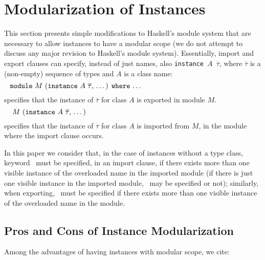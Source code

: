 \section{Modularization of Instances}
\label{sec:modular-instances}

This section presents simple modifications to Haskell's module system
that are necessary to allow instances to have a modular scope
\cite{Controlling-scope-instances} (we do not attempt to discuss any
major revision to Haskell's module system). Essentially, import and
export clauses can specify, instead of just names, also {\tt instance
  $A$ $\overline{\tau}$}, where $\overline{\tau}$ is a (non-empty)
sequence of types and $A$ is a class name:
  \[ \parbox{\textwidth}{\rm{ \module\ $M$ (\instance\ $A$ $\overline{\tau}$, \ldots) \where\ \ldots}} \]
specifies that the instance of $\overline{\tau}$ for class $A$ is
exported in module $M$.
  \[ \parbox{\textwidth}{\rm{ \ $M$ (\instance\ $A$ $\overline{\tau}$, \ldots)}} \]
specifies that the instance of $\overline{\tau}$ for class $A$ is
imported from $M$, in the module where the import clause occurs.

In this paper we consider that, in the case of instances without a
type class, keyword \instance\ must be specified, in an import clause,
if there exists more than one visible instance of the overloaded name
in the imported module (if there is just one visible instance in the
imported module, \instance\ may be specified or not); similarly, when
exporting, \instance\ must be specified if there exists more than one
visible instance of the overloaded name in the module.

\subsection{Pros and Cons of Instance Modularization}

Among the advantages of having instances with modular scope, we cite:

